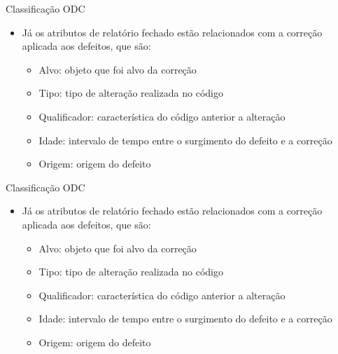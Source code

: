 \documentclass[brazilian]{beamer}
\begin{document}
\begin{frame}{Classificação ODC}
    \begin{itemize}
        \item Já os atributos de relatório fechado estão relacionados com a correção aplicada aos defeitos, que são:
        \begin{itemize}
            \item Alvo: objeto que foi alvo da correção
            \item Tipo: tipo de alteração realizada no código
            \item Qualificador: característica do código anterior a alteração
            \item Idade: intervalo de tempo entre o surgimento do defeito e a correção
            \item Origem: origem do defeito
        \end{itemize}
    \end{itemize}
\end{frame}

\begin{frame}{Classificação ODC}
    \begin{itemize}
        \item Já os atributos de relatório fechado estão relacionados com a correção aplicada aos defeitos, que são:
        \begin{itemize}
            \item Alvo: objeto que foi alvo da correção
            \item Tipo: tipo de alteração realizada no código
            \item Qualificador: característica do código anterior a alteração
            \item Idade: intervalo de tempo entre o surgimento do defeito e a correção
            \item Origem: origem do defeito
        \end{itemize}
    \end{itemize}
\end{frame}
\end{document}
